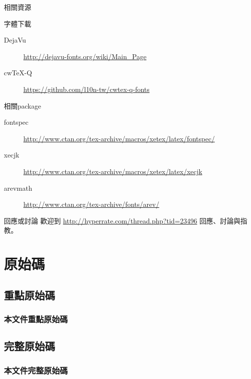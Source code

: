 \documentclass[10pt, aspectratio=1610]{beamer}
\begin{document}
\begin{frame}{相關資源}
\begin{block}{字體下載}
\begin{description}
\item[DejaVu] {\url{http://dejavu-fonts.org/wiki/Main_Page}}
\item[cwTeX-Q] {\url{https://github.com/l10n-tw/cwtex-q-fonts}}
\end{description}
\end{block}
\begin{block}{相關package}
\begin{description}
\item[fontspec] {\url{http://www.ctan.org/tex-archive/macros/xetex/latex/fontspec/}}
\item[xecjk] {\url{http://www.ctan.org/tex-archive/macros/xetex/latex/xecjk}}
\item[arevmath] {\url{http://www.ctan.org/tex-archive/fonts/arev/}}
\end{description}
\end{block}
\begin{block}{回應或討論}
歡迎到 \alert{\url{http://hyperrate.com/thread.php?tid=23496}} 回應、討論與指教。
\end{block}
\end{frame}

\section{原始碼}

\subsection{重點原始碼}

\begin{frame}
\frametitle{本文件重點原始碼}
{
  \CJKsetecglue{} 
}
\end{frame}

\subsection{完整原始碼}
\begin{frame}[allowframebreaks]
\frametitle{本文件完整原始碼}
{
  \CJKsetecglue{} 
}
\end{frame}
\end{document}
